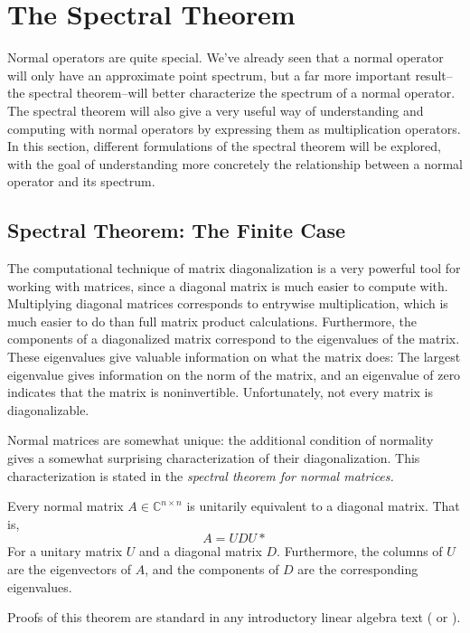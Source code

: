 \section{The Spectral Theorem}
Normal operators are quite special. We've already seen that a normal operator
will only have an approximate point spectrum, but a far more important
result--the spectral theorem--will better characterize the spectrum of a normal
operator. The spectral theorem will also give a very useful way of understanding
and computing with normal operators by expressing them as multiplication
operators. In this section, different formulations of the spectral theorem will
be explored, with the goal of understanding more concretely the relationship
between a normal operator and its spectrum.

\subsection{Spectral Theorem: The Finite Case}
The computational technique of matrix diagonalization is a very powerful tool
for working with matrices, since a diagonal matrix is much easier to compute
with.  Multiplying diagonal matrices corresponds to entrywise multiplication,
which is much easier to do than full matrix product calculations. Furthermore,
the components of a diagonalized matrix correspond to the eigenvalues of the
matrix.  These eigenvalues give valuable information on what the matrix does:
The largest eigenvalue gives information on the norm of the matrix, and an
eigenvalue of zero indicates that the matrix is noninvertible. Unfortunately,
not every matrix is diagonalizable.

Normal matrices are somewhat unique: the additional condition of normality gives
a somewhat surprising characterization of their diagonalization. This
characterization is stated in the \em spectral theorem \em for normal matrices.
\begin{theorem}
    Every normal matrix $A\in\mathbb{C}^{n\times n}$ is unitarily equivalent to
    a diagonal matrix. That is,
    \[
        A = UDU*
        \]
    For a unitary matrix $U$ and a diagonal matrix $D$. Furthermore, the columns
    of $U$ are the eigenvectors of $A$, and the components of $D$ are the
    corresponding eigenvalues.
\end{theorem}
Proofs of this theorem are standard in any introductory linear algebra
text (\cite[Ch. 17.3]{Lang1993} or \cite[p. 91]{MacCluer2009}).

